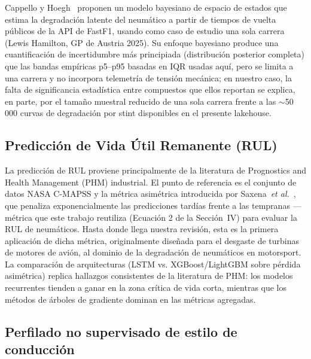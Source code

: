 \documentclass[conference]{IEEEtran}
\begin{document}
Cappello y Hoegh~\cite{cappello2025tire} proponen un modelo bayesiano de
espacio de estados que estima la degradación latente del neumático a partir
de tiempos de vuelta públicos de la API de FastF1, usando como caso de
estudio una sola carrera (Lewis Hamilton, GP de Austria 2025). Su enfoque
bayesiano produce una cuantificación de incertidumbre más principiada
(distribución posterior completa) que las bandas empíricas p5–p95 basadas en
IQR usadas aquí, pero se limita a una carrera y no incorpora telemetría de
tensión mecánica; en nuestro caso, la falta de significancia estadística
entre compuestos que ellos reportan se explica, en parte, por el tamaño
muestral reducido de una sola carrera frente a las $\sim$50\,000 curvas de
degradación por stint disponibles en el presente lakehouse.

\subsection{Predicción de Vida Útil Remanente (RUL)}

La predicción de RUL proviene principalmente de la literatura de
Prognostics and Health Management (PHM) industrial. El punto de referencia es
el conjunto de datos NASA C-MAPSS y la métrica asimétrica introducida por
Saxena~\emph{et al.}~\cite{saxena2008}, que penaliza exponencialmente las
predicciones tardías frente a las tempranas —métrica que este trabajo
reutiliza (Ecuación 2 de la Sección~IV) para evaluar la RUL de neumáticos.
Hasta donde llega nuestra revisión, esta es la primera aplicación de dicha
métrica, originalmente diseñada para el desgaste de turbinas de motores de
avión, al dominio de la degradación de neumáticos en motorsport. La
comparación de arquitecturas (LSTM vs. XGBoost/LightGBM sobre pérdida
asimétrica) replica hallazgos consistentes de la literatura de PHM: los
modelos recurrentes tienden a ganar en la zona crítica de vida corta, mientras
que los métodos de árboles de gradiente dominan en las métricas agregadas.

\subsection{Perfilado no supervisado de estilo de conducción}
\end{document}
